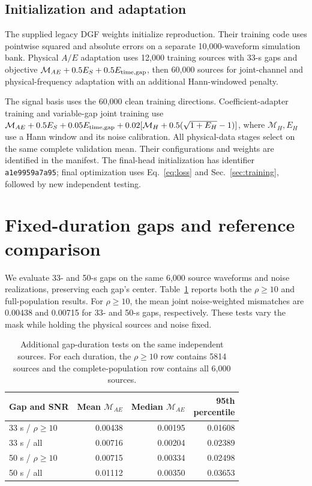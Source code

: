 \documentclass[10pt,prd,aps,a4paper,twocolumn,superscriptaddress,nofootinbib,floatfix]{revtex4-2}
\begin{document}
\subsection{Initialization and adaptation}\label{app:initialization}
The supplied legacy DGF weights initialize reproduction. Their training code uses pointwise squared and absolute errors on a separate 10,000-waveform simulation bank. Physical $A/E$ adaptation uses 12,000 training sources with 33-s gaps and objective $\mathcal M_{AE}+0.5E_S+0.5E_{\rm time,gap}$, then 60,000 sources for joint-channel and physical-frequency adaptation with an additional Hann-windowed penalty.

The signal basis uses the 60,000 clean training directions. Coefficient-adapter training and variable-gap joint training use $\mathcal M_{AE}+0.5E_S+0.05E_{\rm time,gap}+0.02[\mathcal M_H+0.5(\sqrt{1+E_H}-1)]$, where $\mathcal M_H,E_H$ use a Hann window and its noise calibration. All physical-data stages select on the same complete validation mean. Their configurations and weights are identified in the manifest. The final-head initialization has identifier \texttt{a1e9959a7a95}; final optimization uses Eq.~\eqref{eq:loss} and Sec.~\ref{sec:training}, followed by new independent testing.

\section{Fixed-duration gaps and reference comparison}\label{app:fixed_gaps}
We evaluate 33- and 50-s gaps on the same 6,000 source waveforms and noise realizations, preserving each gap's center. Table~\ref{tab:fixed_gaps} reports both the $\rho\ge10$ and full-population results. For $\rho\ge10$, the mean joint noise-weighted mismatches are 0.00438 and 0.00715 for 33- and 50-s gaps, respectively. These tests vary the mask while holding the physical sources and noise fixed.
\begin{table}[t]\centering\setlength{\tabcolsep}{2pt}
\caption{Additional gap-duration tests on the same independent sources. For each duration, the $\rho\ge10$ row contains 5814 sources and the complete-population row contains all 6,000 sources.}\label{tab:fixed_gaps}
\begin{tabular}{lrrr}\hline\hline
Gap and SNR & Mean $\mathcal M_{AE}$ & Median $\mathcal M_{AE}$ & \shortstack{95th\\percentile}\\\hline
33 s / $\rho\ge10$ & 0.00438 & 0.00195 & 0.01608\\
33 s / all & 0.00716 & 0.00204 & 0.02389\\
50 s / $\rho\ge10$ & 0.00715 & 0.00334 & 0.02498\\
50 s / all & 0.01112 & 0.00350 & 0.03653\\
\hline\hline\end{tabular}\end{table}
\end{document}
